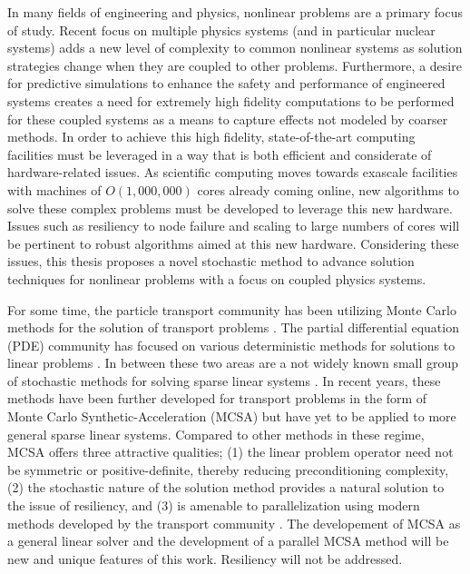 \vcinfo{}

In many fields of engineering and physics, nonlinear problems are a
primary focus of study. Recent focus on multiple physics systems (and
in particular nuclear systems) adds a new level of complexity to
common nonlinear systems as solution strategies change when they are
coupled to other problems. Furthermore, a desire for predictive
simulations to enhance the safety and performance of engineered
systems creates a need for extremely high fidelity computations to be
performed for these coupled systems as a means to capture effects not
modeled by coarser methods. In order to achieve this high fidelity,
state-of-the-art computing facilities must be leveraged in a way that
is both efficient and considerate of hardware-related issues. As
scientific computing moves towards exascale facilities with machines
of $O(1,000,000)$ cores already coming online, new algorithms to solve
these complex problems must be developed to leverage this new
hardware. Issues such as resiliency to node failure and scaling to
large numbers of cores will be pertinent to robust algorithms aimed at
this new hardware. Considering these issues, this thesis proposes a
novel stochastic method to advance solution techniques for nonlinear
problems with a focus on coupled physics systems.

For some time, the particle transport community has been utilizing
Monte Carlo methods for the solution of transport problems
\cite{Lewis_1993}. The partial differential equation (PDE) community
has focused on various deterministic methods for solutions to linear
problems \cite{Saad_2003}. In between these two areas are a not widely
known small group of stochastic methods for solving sparse linear
systems \cite{Hammersley_1964, Halton_1962, Halton_1994}. In recent
years, these methods have been further developed for transport
problems in the form of Monte Carlo Synthetic-Acceleration (MCSA)
\cite{Evans_2003, Evans_2009} but have yet to be applied to more
general sparse linear systems. Compared to other methods in these
regime, MCSA offers three attractive qualities; (1) the linear problem
operator need not be symmetric or positive-definite, thereby reducing
preconditioning complexity, (2) the stochastic nature of the
solution method provides a natural solution to the issue of resiliency,
and (3) is amenable to parallelization using modern methods developed by
the transport community \cite{Wagner_2011}. The developement of MCSA
as a general linear solver and the development of a parallel MCSA
method will be new and unique features of this work. Resiliency will
not be addressed.

